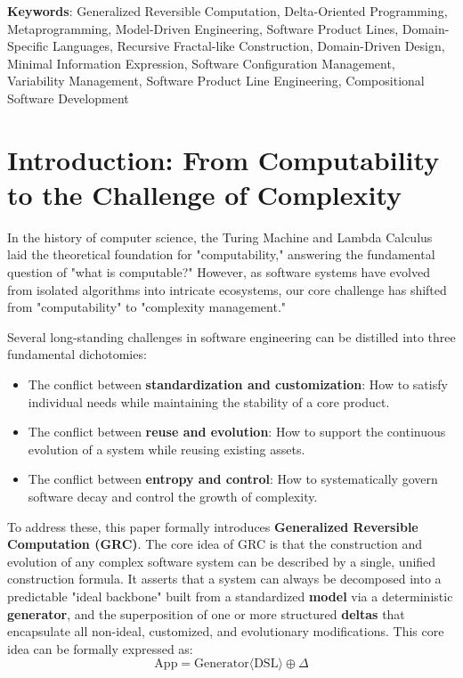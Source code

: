 \documentclass[11pt]{article}
\begin{document}
\vspace{1em}
\noindent\textbf{Keywords}: Generalized Reversible Computation, Delta-Oriented Programming, Metaprogramming, Model-Driven Engineering, Software Product Lines, Domain-Specific Languages, Recursive Fractal-like Construction, Domain-Driven Design, Minimal Information Expression, Software Configuration Management, Variability Management, Software Product Line Engineering, Compositional Software Development

\section{Introduction: From Computability to the Challenge of Complexity}

In the history of computer science, the Turing Machine and Lambda Calculus laid the theoretical foundation for "computability," answering the fundamental question of "what is computable?" However, as software systems have evolved from isolated algorithms into intricate ecosystems, our core challenge has shifted from "computability" to "complexity management."

Several long-standing challenges in software engineering can be distilled into three fundamental dichotomies:
\begin{itemize}
    \item The conflict between \textbf{standardization and customization}: How to satisfy individual needs while maintaining the stability of a core product.
    \item The conflict between \textbf{reuse and evolution}: How to support the continuous evolution of a system while reusing existing assets.
    \item The conflict between \textbf{entropy and control}: How to systematically govern software decay and control the growth of complexity.
\end{itemize}

To address these, this paper formally introduces \textbf{Generalized Reversible Computation (GRC)}. The core idea of GRC is that the construction and evolution of any complex software system can be described by a single, unified construction formula. It asserts that a system can always be decomposed into a predictable "ideal backbone" built from a standardized \textbf{model} via a deterministic \textbf{generator}, and the superposition of one or more structured \textbf{deltas} that encapsulate all non-ideal, customized, and evolutionary modifications. This core idea can be formally expressed as:
\[
\text{App} = \text{Generator}\langle\text{DSL}\rangle \oplus \Delta
\]
\end{document}
